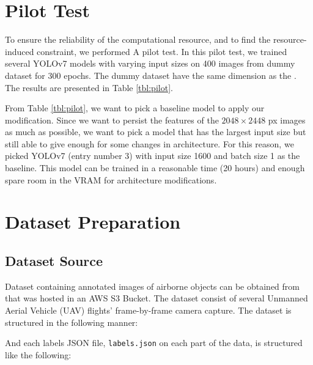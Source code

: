 \section{Pilot Test}
To ensure the reliability of the computational resource, and to find the resource-induced constraint, we performed A
pilot test.
In this pilot test, we trained several YOLOv7 models with varying input sizes on 400 images from dummy dataset for 300 epochs.
The dummy dataset have the same dimension as the \textcite{aot_dataset}.
The results are presented in Table \ref{tbl:pilot}. 
\begin{table}[b]
  \centering
  \label{tbl:pilot}
  \vspace{-1ex}
  \begin{adjustbox}{width=\textwidth}
    
  \end{adjustbox}
\end{table}

From Table \ref{tbl:pilot}, we want to pick a baseline model to apply our modification.
Since we want to persist the features of the $2048\times 2448$ px images as much as possible, 
we want to pick a model that has the largest input size but still able to give enough for some 
changes in architecture. 
For this reason, we picked YOLOv7 (entry number 3) with input size 1600 and batch size 1 as the baseline.
This model can be trained in a reasonable time (20 hours) and enough spare room in the VRAM for architecture modifications.


\section{Dataset Preparation}
\label{section:dataset}

  \subsection{Dataset Source}
  \label{section:datasetsource}
  Dataset containing annotated images of airborne objects can be obtained from \textcite{aot_dataset}
  that was hosted in an AWS S3 Bucket.
  The dataset consist of several Unmanned Aerial Vehicle (UAV) flights' frame-by-frame camera capture.
  The dataset is structured in the following manner:

  

  And each labels JSON file, \verb|labels.json| on each part of the data, is structured like the following:

